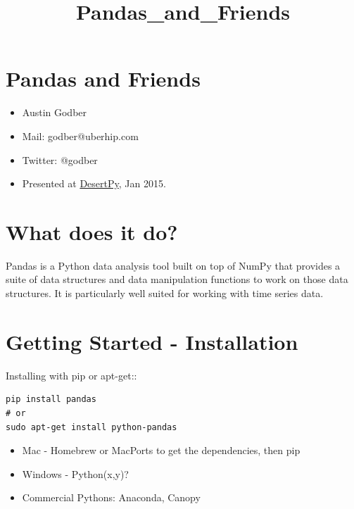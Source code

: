 \documentclass{article}
\title{Pandas\_and\_Friends}
\begin{document}
    
    
    \maketitle
    
    

    
    \section{Pandas and Friends}\label{pandas-and-friends}

\begin{itemize}
\itemsep1pt\parskip0pt
\item
  Austin Godber
\item
  Mail: godber@uberhip.com
\item
  Twitter: @godber
\item
  Presented at \href{http://desertpy.com}{DesertPy}, Jan 2015.
\end{itemize}

    \section{What does it do?}\label{what-does-it-do}

Pandas is a Python data analysis tool built on top of NumPy that
provides a suite of data structures and data manipulation functions to
work on those data structures. It is particularly well suited for
working with time series data.

    \section{Getting Started -
Installation}\label{getting-started---installation}

Installing with pip or apt-get::

\begin{verbatim}
pip install pandas
# or
sudo apt-get install python-pandas
\end{verbatim}

\begin{itemize}
\itemsep1pt\parskip0pt
\item
  Mac - Homebrew or MacPorts to get the dependencies, then pip
\item
  Windows - Python(x,y)?
\item
  Commercial Pythons: Anaconda, Canopy
\end{itemize}
\end{document}
